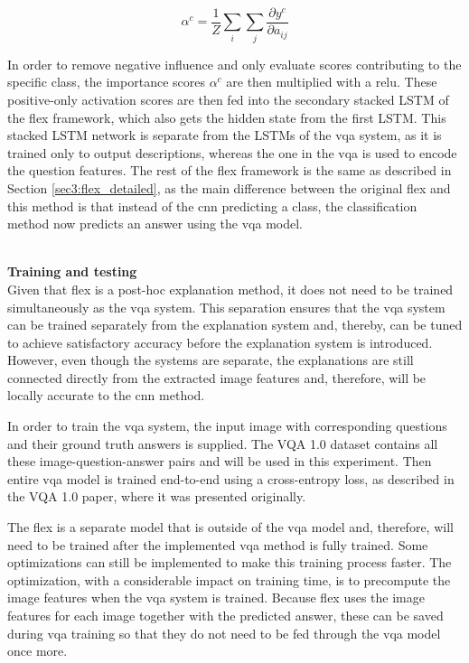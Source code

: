         \begin{equation}
            \alpha^c = \frac{1}{Z} \sum_i \sum_j \frac{\partial y^c}{\partial a_{ij}} 
        \label{eq:flex_activaiton_score}
        \end{equation}


        In order to remove negative influence and only evaluate scores contributing to the specific class, the importance scores $\alpha^c$ are then multiplied with a \gls{relu}. These positive-only activation scores are then fed into the secondary stacked LSTM of the \gls{flex} framework, which also gets the hidden state from the first LSTM. This stacked LSTM network is separate from the LSTMs of the \gls{vqa} system, as it is trained only to output descriptions, whereas the one in the \gls{vqa} is used to encode the question features. 
        The rest of the \gls{flex} framework is the same as described in Section \ref{sec3:flex_detailed}, as the main difference between the original \gls{flex} and this method is that instead of the \gls{cnn} predicting a class, the classification method now predicts an answer using the \gls{vqa} model.
        
        
        
        \textbf{\\Training and testing\\}
        Given that \gls{flex} is a post-hoc explanation method, it does not need to be trained simultaneously as the \gls{vqa} system. This separation ensures that the \gls{vqa} system can be trained separately from the explanation system and, thereby, can be tuned to achieve satisfactory accuracy before the explanation system is introduced.
        However, even though the systems are separate, the explanations are still connected directly from the extracted image features and, therefore, will be locally accurate to the \gls{cnn} method.

        In order to train the \gls{vqa} system, the input image with corresponding questions and their ground truth answers is supplied. The VQA 1.0 dataset contains all these image-question-answer pairs and will be used in this experiment.
        Then entire \gls{vqa} model is trained end-to-end using a cross-entropy loss, as described in the VQA 1.0 paper, where it was presented originally.

        The \gls{flex} is a separate model that is outside of the \gls{vqa} model and, therefore, will need to be trained after the implemented \gls{vqa} method is fully trained. Some optimizations can still be implemented to make this training process faster. The optimization, with a considerable impact on training time, is to precompute the image features when the \gls{vqa} system is trained. Because \gls{flex} uses the image features for each image together with the predicted answer, these can be saved during \gls{vqa} training so that they do not need to be fed through the \gls{vqa} model once more.


